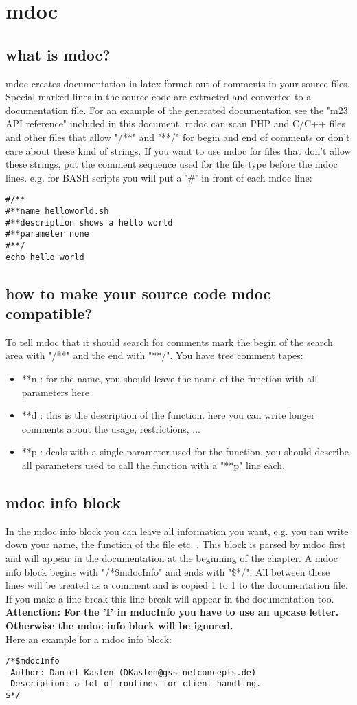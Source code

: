 \section{mdoc}
\subsection{what is mdoc?}
mdoc creates documentation in latex format out of comments in your source files. Special marked lines in the source code are extracted and converted to a documentation file. For an example of the generated documentation see the "m23 API reference" included in this document. mdoc can scan PHP and C/C++ files and other files that allow "/**" and "**/" for begin and end of comments or don't care about these kind of strings. If you want to use mdoc for files that don't allow these strings, put the comment sequence used for the file type before the mdoc lines. e.g. for BASH scripts you will put a '\#' in front of each mdoc line:
\begin{verbatim}
#/**
#**name helloworld.sh
#**description shows a hello world
#**parameter none
#**/
echo hello world
\end{verbatim} 
\subsection{how to make your source code mdoc compatible?}
To tell mdoc that it should search for comments mark the begin of the search area with "/**" and the end with "**/". You have tree comment tapes:\\
\begin{itemize}
\item **n : for the name, you should leave the name of the function with all parameters here
\item **d : this is the description of the function. here you can write longer comments about the usage, restrictions, ...
\item **p : deals with a single parameter used for the function. you should describe all parameters used to call the function with a "**p" line each.
\end{itemize}
\subsection{mdoc info block}
In the mdoc info block you can leave all information you want, e.g. you can write down your name, the function of the file etc. . This block is parsed by mdoc first and will appear in the documentation at the beginning of the chapter. A mdoc info block begins with "/*\$mdocInfo" and ends with "\$*/". All between these lines will be treated as a comment and is copied 1 to 1 to the documentation file. If you make a line break this line break will appear in the documentation too.\\
\textbf{Attenction: For the 'I' in mdocInfo you have to use an upcase letter. Otherwise the mdoc info block will be ignored.}\\
Here an example for a mdoc info block:
\begin{verbatim}
/*$mdocInfo
 Author: Daniel Kasten (DKasten@gss-netconcepts.de)
 Description: a lot of routines for client handling.
$*/
\end{verbatim}

